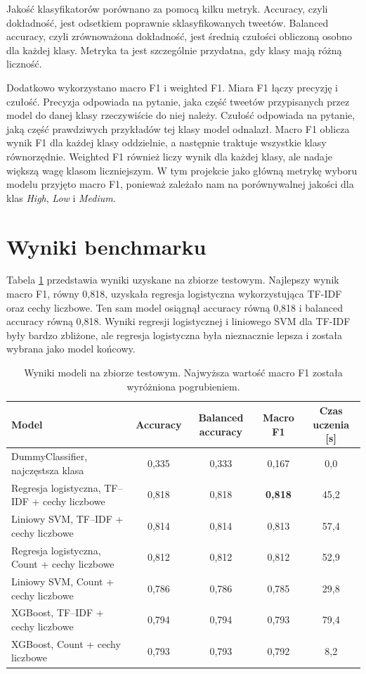 \documentclass[12pt, a4paper, oneside]{scrreprt}
\begin{document}
Jakość klasyfikatorów porównano za pomocą kilku metryk.
Accuracy, czyli dokładność, jest odsetkiem poprawnie sklasyfikowanych tweetów.
Balanced accuracy, czyli zrównoważona dokładność, jest średnią czułości obliczoną
osobno dla każdej klasy. Metryka ta jest szczególnie przydatna, gdy klasy mają
różną liczność.~\cite{BalancedAccuracy}

Dodatkowo wykorzystano macro F1 i weighted F1. Miara F1 łączy precyzję i czułość.
Precyzja odpowiada na pytanie, jaka część tweetów przypisanych przez model do danej
klasy rzeczywiście do niej należy. Czułość odpowiada na pytanie, jaką część
prawdziwych przykładów tej klasy model odnalazł. Macro F1 oblicza wynik F1
dla każdej klasy oddzielnie, a następnie traktuje wszystkie klasy równorzędnie.
Weighted F1 również liczy wynik dla każdej klasy, ale nadaje większą wagę
klasom liczniejszym. W tym projekcie jako główną metrykę wyboru modelu
przyjęto macro F1, ponieważ zależało nam na porównywalnej jakości
dla klas \emph{High}, \emph{Low} i \emph{Medium}.

\section{Wyniki benchmarku}

Tabela \ref{tab:benchmark} przedstawia wyniki uzyskane na zbiorze testowym.
Najlepszy wynik macro F1, równy 0,818, uzyskała regresja logistyczna
wykorzystująca TF-IDF oraz cechy liczbowe. Ten sam model osiągnął accuracy
równą 0,818 i balanced accuracy równą 0,818. Wyniki regresji logistycznej
i liniowego SVM dla TF-IDF były bardzo zbliżone, ale regresja logistyczna
była nieznacznie lepsza i została wybrana jako model końcowy.

\begin{table}[H]
\centering
\small
\caption{Wyniki modeli na zbiorze testowym. Najwyższa wartość macro F1 została wyróżniona pogrubieniem.}
\label{tab:benchmark}
\begin{tabularx}{\textwidth}{>{\raggedright\arraybackslash}Xcccc}
\toprule
Model & Accuracy & Balanced accuracy & Macro F1 & Czas uczenia [s] \\
\midrule
DummyClassifier, najczęstsza klasa & 0,335 & 0,333 & 0,167 & 0,0 \\
Regresja logistyczna, TF--IDF + cechy liczbowe & 0,818 & 0,818 & \textbf{0,818} & 45,2 \\
Liniowy SVM, TF--IDF + cechy liczbowe & 0,814 & 0,814 & 0,813 & 57,4 \\
Regresja logistyczna, Count + cechy liczbowe & 0,812 & 0,812 & 0,812 & 52,9 \\
Liniowy SVM, Count + cechy liczbowe & 0,786 & 0,786 & 0,785 & 29,8 \\
XGBoost, TF--IDF + cechy liczbowe & 0,794 & 0,794 & 0,793 & 79,4 \\
XGBoost, Count + cechy liczbowe & 0,793 & 0,793 & 0,792 & 8,2 \\
\bottomrule
\end{tabularx}
\end{table}
\end{document}
